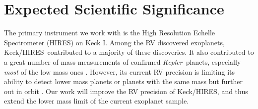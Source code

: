 \documentclass[12pt]{article}
\def\kepler{{\it Kepler}}
\def\keck{Keck/HIRES}
\begin{document}
\vspace{-30pt}
\section{Expected Scientific Significance}

The primary instrument we work with is the High Resolution Echelle
Spectrometer (HIRES) on Keck I. Among the RV discovered exoplanets,
\keck\ contributed to a majority of these discoveries. It also
contributed to a great number of mass measurements of confirmed
\kepler\ planets, especially \textit{most} of the low mass ones
\citep[e.g.,][]{gautier2012,gilliland2013,marcy2014}. However, its
current RV precision is limiting its ability to detect lower mass
planets or planets with the same mass but further out in orbit
\citep[e.g.,][]{marcy2014}. Our work will improve the RV precision of
\keck, and thus extend the lower mass limit of the current exoplanet sample.



\begin{comment}
We will work with the two leading RV instruments on 10-meter-class
telescopes: the High Resolution Echelle Spectrometer (HIRES) on Keck I
and the High Resolution Spectrograph (HRS) on the Hobby-Eberly
Telescope (HET).

Our work also has great synergy with two very high RV precision
instruments on smaller telescopes: CHIRON on the 1.5m SMARTS
telescope at CTIO and the upcoming project Minerva with an array of
four 0.7m telescopes.
  
The field of exoplanet is progressing in a fast pace towards the
discovery of Earth-like planets around other stars. During the past
decades, we have moved on from the age of booming discoveries of
Jupiter-mass exoplanets via radial velocimetry (add ref) to the
\kepler\ era where there are thousands of Earth- and super-Earth-size
exoplanet candidates (add ref). Moreover, great promises lie ahead with
future ground-based instruments (e.g., ESPRESSO; add ref) or space
missions (e.g., TESS; add ref).
\end{comment}


\vspace{-3pt}
\end{document}
